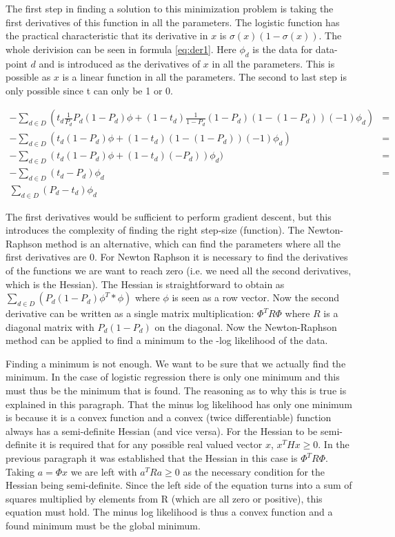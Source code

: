 \documentclass{scrartcl}
\begin{document}
The first step in finding a solution to this minimization problem is taking the first derivatives of this function in all the parameters. The logistic function has the practical characteristic that its derivative in $x$ is $\sigma (x) (1- \sigma(x))$. The whole derivision can be seen in formula \ref{eq:der1}. Here $\phi_{d}$ is the data for data-point $d$ and is introduced as the derivatives of $x$ in all the parameters. This is possible as $x$ is a linear function in all the parameters. The second to last step is only possible since t can only be 1 or 0. 

\begin{equation}
\label{eq:der1}
\begin{split}
-\sum_{d \in D}(t_{d} \frac{1}{P_{d}} P_{d} (1-P_{d})\phi + (1-t_{d}) \frac{1}{1-P_{d}}(1-P_{d}) (1-(1-P_{d}))(-1)\phi_{d}) &=  \\
-\sum_{d \in D}(t_{d} (1-P_{d})\phi + (1-t_{d})(1-(1-P_{d}))(-1)\phi_{d}) &= \\
-\sum_{d \in D}(t_{d} (1-P_{d})\phi + (1-t_{d})(-P_{d}))\phi_{d}) & = \\
-\sum_{d \in D}(t_{d}-P_{d})\phi_{d} &= \\
\sum_{d \in D}(P_{d}-t_{d})\phi_{d} &
\end{split}
\end{equation}

The first derivatives would be sufficient to perform gradient descent, but this introduces the complexity of finding the right step-size (function). The Newton-Raphson method is an alternative, which can find the parameters where all the first derivatives are 0. For Newton Raphson it is necessary to find the derivatives of the functions we are want to reach zero (i.e. we need all the second derivatives, which is the Hessian). The Hessian is straightforward to obtain as $\sum_{d \in D}(P_{d} (1-P_{d}) \phi^{T}*\phi)$ where $\phi$ is seen as a row vector. Now the second derivative can be written as a single matrix multiplication: $\Phi^{T} R \Phi$ where $R$ is a diagonal matrix with $P_{d} (1-P_{d})$ on the diagonal. Now the Newton-Raphson method can be applied to find a minimum to the -log likelihood of the data.

Finding a minimum is not enough. We want to be sure that we actually find the minimum. In the case of logistic regression there is only one minimum and this must thus be the minimum that is found. The reasoning as to why this is true is explained in this paragraph. That the minus log likelihood has only one minimum is because it is a convex function and a convex (twice differentiable) function always has a semi-definite Hessian (and vice versa). For the Hessian to be semi-definite it is required that for any possible real valued vector $x$, $x^{T}Hx\geq 0$. In the previous paragraph it was established that the Hessian in this case is $\Phi^{T} R \Phi$. Taking $a=\Phi x$ we are left with $a^{T}Ra\geq 0$ as the necessary condition for the Hessian being semi-definite. Since the left side of the equation turns into a sum of squares multiplied by elements from R (which are all zero or positive), this equation must hold. The minus log likelihood is thus a convex function and a found minimum must be the global minimum.
\end{document}
